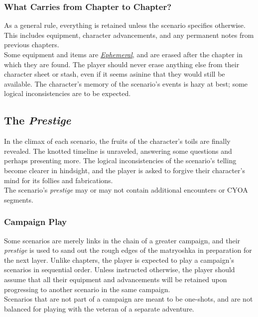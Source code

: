 \documentclass[12pt]{article}
\newcommand{\reftoit}[1]{\hyperlink{#1}{\emph{#1}}}
\begin{document}
\begin{multicols*}{2}
\subsubsection*{What Carries from Chapter to Chapter?}
As a general rule, everything is retained unless the scenario specifies otherwise. This includes equipment, character advancements, and any permanent notes from previous chapters.\\
Some equipment and items are \reftoit{Ephemeral}, and are erased after the chapter in which they are found. The player should never erase anything else from their character sheet or stash, even if it seems asinine that they would still be available. The character’s memory of the scenario’s events is hazy at best; some logical inconsistencies are to be expected.

\subsection{The \emph{Prestige}}
In the climax of each scenario, the fruits of the character’s toils are finally revealed. The knotted timeline is unraveled, answering some questions and perhaps presenting more. The logical inconsistencies of the scenario’s telling become clearer in hindsight, and the player is asked to forgive their character’s mind for its follies and fabrications.\\
The scenario’s \emph{prestige} may or may not contain additional encounters or CYOA segments.

\subsubsection*{Campaign Play}
Some scenarios are merely links in the chain of a greater campaign, and their \emph{prestige} is used to sand out the rough edges of the matryoshka in preparation for the next layer. Unlike chapters, the player is expected to play a campaign’s scenarios in sequential order. Unless instructed otherwise, the player should assume that all their equipment and advancements will be retained upon progressing to another scenario in the same campaign.\\
Scenarios that are not part of a campaign are meant to be one-shots, and are not balanced for playing with the veteran of a separate adventure. 

\vfill
\pagebreak


\end{multicols*}
\end{document}
